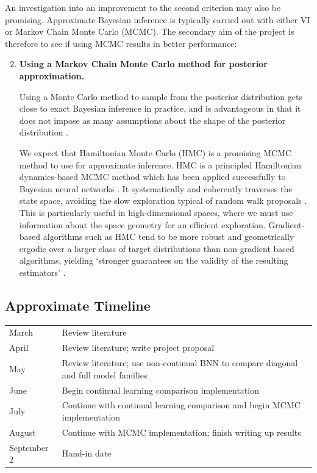 \documentclass[a4paper,11=0pt]{article}
\begin{document}
\vspace{0.5em}
An investigation into an improvement to the second criterion may also be promising. Approximate Bayesian inference is typically carried out with either VI or Markov Chain Monte Carlo (MCMC). The secondary aim of the project is therefore to see if using MCMC results in better performance:
\begin{enumerate}
\setcounter{enumi}{1}
\item \textbf{Using a Markov Chain Monte Carlo method for posterior approximation.}

Using a Monte Carlo method to sample from the posterior distribution gets close to exact Bayesian inference in practice, and is advantageous in that it does not impose as many assumptions about the shape of the posterior distribution \cite{hinton}.

We expect that Hamiltonian Monte Carlo (HMC) is a promising MCMC method to use for approximate inference. HMC is a principled Hamiltonian dynamics-based MCMC method which has been applied successfully to Bayesian neural networks \cite{neal1995}. It systematically and coherently traverses the state space, avoiding the slow exploration typical of random walk proposals \cite{neal2012}. This is particularly useful in high-dimensional spaces, where we must use information about the space geometry for an efficient exploration. Gradient-based algorithms such as HMC tend to be more robust and geometrically ergodic over a larger class of target distributions than non-gradient based algorithms, yielding `stronger guarantees on the validity of the resulting estimators' \cite{betancourt}.
\end{enumerate}


\subsection*{Approximate Timeline}

\begin{tabular}{l|l}
\hline
March 	& Review literature\\
April	& Review literature; write project proposal\\
May		& Review literature; use non-continual BNN to compare diagonal and full model families\\ %
June 	& Begin continual learning comparison implementation\\
July	& Continue with continual learning comparison and begin MCMC implementation \\
August	& Continue with MCMC implementation; finish writing up results\\%
September 2 & Hand-in date\\
\hline
\end{tabular}
\end{document}
